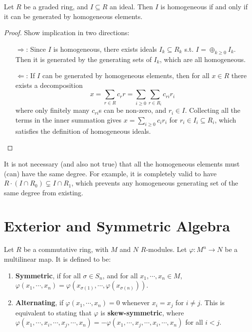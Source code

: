 \documentclass{article}
\begin{document}
\begin{proposition}
    Let $R$ be a graded ring, and $I \subseteq R$ an ideal. Then $I$ is homogeneous if and only if it can be generated by homogeneous elements. 
\end{proposition}

\begin{proof}
    Show implication in two directions:
    \begin{enumerate}
        \item[$\Rightarrow$:] Since $I$ is homogeneous, there exists ideals $I_k \subseteq R_k$ s.t. $I = \oplus_{k \geq 0} I_k$. Then it is generated by the generating sets of $I_k$, which are all homogeneous.
        \item[$\Leftarrow$:] If $I$ can be generated by homogeneous elements, then for all $x \in R$ there exists a decomposition
        \[
            x = \sum_{r \in R} c_r r = \sum_{i \geq 0} \sum_{r \in R_i} c_{ri} r_i
        \]
        where only finitely many $c_{ri}$s can be non-zero, and $r_i \in I$. Collecting all the terms in the inner summation gives $x = \sum_{i \geq 0} c_i r_i$ for $r_i \in I_i \subseteq R_i$, which satisfies the definition of homogeneous ideals.
    \end{enumerate}
\end{proof}

\begin{remark}
    It is not necessary (and also not true) that all the homogeneous elements must (can) have the same degree. For example, it is completely valid to have $R \cdot (I \cap R_0) \subsetneq I \cap R_1$, which prevents any homogeneous generating set of the same degree from existing. 
\end{remark}

\section{Exterior and Symmetric Algebra}

\begin{definition}
    Let $R$ be a commutative ring, with $M$ and $N$ $R$-modules. Let $\varphi: M^n \to N$ be a multilinear map. It is defined to be:
    \begin{enumerate}[label=\roman*)]
        \item \textbf{Symmetric}, if for all $\sigma \in S_n$, and for all $x_1, \cdots, x_n \in M$, $\varphi(x_1, \cdots, x_n) = \varphi(x_{\sigma(1)}, \cdots, \varphi(x_{\sigma(n)}))$.
        \item \textbf{Alternating}, if $\varphi(x_1, \cdots, x_n) = 0$ whenever $x_i = x_j$ for $i \neq j$. This is equivalent to stating that $\varphi$ is \textbf{skew-symmetric}, where $\varphi(x_1, \cdots, x_i, \cdots, x_j, \cdots, x_n) = -\varphi(x_1, \cdots, x_j, \cdots, x_i, \cdots, x_n)$ for all $i < j$.
    \end{enumerate}
\end{definition}
\end{document}
